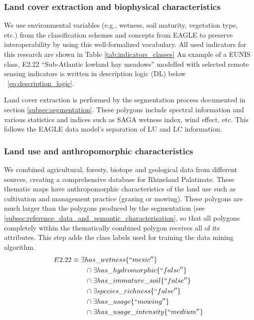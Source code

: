 \documentclass[authoryear, review,12pt,number]{elsarticle}
\begin{document}
\subsubsection{Land cover extraction and biophysical characteristics}
\label{subsec:LC_biophysical}
We use environmental variables (e.g., wetness, soil maturity, vegetation type,
etc.) from the classification schemes and concepts from EAGLE to preserve
interoperability by using this well-formalized vocabulary. All used indicators
for this research are shown in Table \ref{tab:indicators_classes} An example of
a EUNIS class, E2.22 ``Sub-Atlantic lowland hay meadows'' modelled with selected
remote sensing indicators is written in description logic (DL) below
~\ref{eq:description_logic}.

Land cover extraction is performed by the segmentation process documented in 
section \ref{subsec:segmentation}.  These polygons include spectral information 
and various statistics and indices such as SAGA wetness index, wind effect, 
etc. This follows the EAGLE data model's separation of LU and LC information.

\subsubsection{Land use and anthropomorphic characteristics}
\label{subsec:LU_anthropomorphic}
We combined agricultural, foresty, biotope and geological data from different
sources, creating a comprehensive database for Rhineland Palatinate. These
thematic maps have anthropomorphic characteristics of the land use such as
cultivation and management practice (grazing or mowing). These polygons are much
larger than the polygons produced by the segmentation (see
\ref{subsec:reference_data_and_semantic_characterisation}, so
that all polygons completely within the thematically combined polygon receives
all of its attributes. This step adds the class labels used for training the
data mining algorithm. 
\begin{equation}
\begin{align*}
    E2.22 &\equiv \exists has\_wetness \{``mesic''\} \\
    &\qquad {} \cap \exists has\_hydromorphic \{``false''\} \\
    &\qquad {} \cap \exists has\_immature\_soil \{``false''\} \\
    &\qquad {} \cap \exists species\_richness \{``false''\} \\
    &\qquad {} \cap \exists has\_usage \{``mowing''\} \\
    &\qquad {} \cap \exists has\_usage\_intensity \{``medium''\} \\
\end{align*}
\label{eq:description_logic}
\end{equation}
\label{subsec:Selection_of_training_validation_data}
\end{document}
